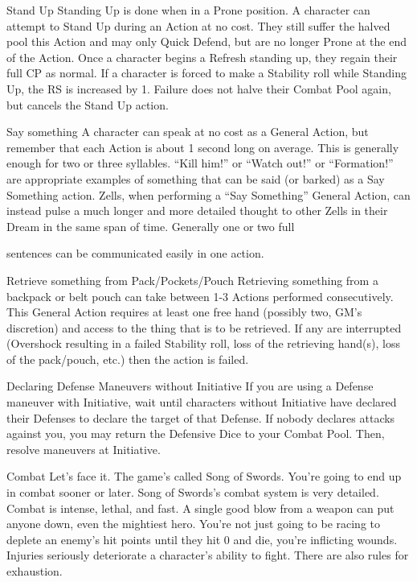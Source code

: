 \documentclass[oneside,11pt,english]{book}
\begin{document}
 

Stand Up 
Standing Up is done when in a Prone position. A character can attempt to Stand Up during an Action at 
no cost. They still suffer the halved pool this Action and may only Quick Defend, but are no longer Prone 
at the end of the Action. Once a character begins a Refresh standing up, they regain their full CP as 
normal. 
If a character is forced to make a Stability roll while Standing Up, the RS is increased by 1. Failure does 
not halve their Combat Pool again, but cancels the Stand Up action. 

 

Say something 
A character can speak at no cost as a General Action, but remember that each Action is about 1 second 
long on average. This is generally enough for two or three syllables. “Kill him!” or “Watch out!” or 
“Formation!” are appropriate examples of something that can be said (or barked) as a Say Something 
action. 
Zells, when performing a “Say Something” General Action, can instead pulse a much longer and more 
detailed thought to other Zells in their Dream in the same span of time. Generally one or two full 


sentences can be communicated easily in one action. 

 

Retrieve something from Pack/Pockets/Pouch 
Retrieving something from a backpack or belt pouch can take between 1-3 Actions performed 
consecutively. This General Action requires at least one free hand (possibly two, GM’s discretion) and 
access to the thing that is to be retrieved. If any are interrupted (Overshock resulting in a failed Stability 
roll, loss of the retrieving hand(s), loss of the pack/pouch, etc.) then the action is failed. 

 

 

 

 

Declaring Defense Maneuvers without Initiative 
If you are using a Defense maneuver with Initiative, wait until characters without Initiative have declared 
their Defenses to declare the target of that Defense. If nobody declares attacks against you, you may 
return the Defensive Dice to your Combat Pool. Then, resolve maneuvers at Initiative. 

 

 

 

Combat 
Let’s face it. The game’s called Song of Swords. You’re going to end up in combat sooner or later. Song 
of Swords’s combat system is very detailed. Combat is intense, lethal, and fast. A single good blow from 
a weapon can put anyone down, even the mightiest hero. You’re not just going to be racing to deplete an 
enemy’s hit points until they hit 0 and die, you’re inflicting wounds. Injuries seriously deteriorate a 
character’s ability to fight. There are also rules for exhaustion. 
\end{document}
